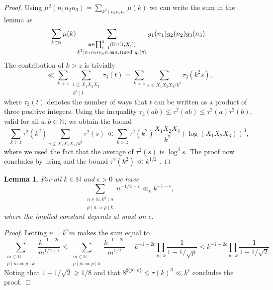 \documentclass[a4paper,12pt,reqno]{amsart}
\numberwithin{equation}{section} \numberwithin{figure}{section}
\newcommand\N{\mathbb{N}}
\newcommand{\md}[1]{  \left(\textnormal{mod}\ #1\right)}
\renewcommand{\b}{\mathbf}
\renewcommand{\leq}{\leqslant}
\renewcommand{\geq}{\geqslant}
\renewcommand{\#}{\sharp}
\newtheorem{lemma}{Lemma}
\theoremstyle{definition}
\numberwithin{lemma}{section}
\begin{document}
\begin{proof}Using $\mu^2(n_1n_2n_3) =\sum_{k^2\mid n_1n_2n_3 } \mu(k)$ we can write the sum in the lemma as 
\[\sum_{\substack{ k\in \N } } \mu(k)
\sum_{\substack{ \b n \in \prod_{i=1}^3 (\N \cap [1,X_i] )\\
k^2\mid n_1n_2n_3   , n_i\equiv a_i \md {q_i} \forall i  } }
 g_1(n_1)g_2(n_2)g_3(n_3).\]The contribution of $k>z$ is trivially \[\ll \sum_{k>z} \sum_{\substack{t\leq X_1X_2X_3\\  k^2 \mid t }} \tau_3(t)=
\sum_{k>z} \sum_{s\leq X_1X_2X_3/k^{2}   } \tau_3(k^2s )
,\] where $\tau_3(t)$ denotes the number of ways 
that $t$ can be written as a product of three positive integers. Using the inequality 
$\tau_3(ab)\leq 
\tau^2(ab ) \leq 
\tau^2(a)\tau^2 (b)$, valid for all $a,b\in \N$,
we obtain the bound  \[\sum_{k>z} \tau^2(k^2 )\sum_{s\leq X_1X_2X_3/k^{2}   } \tau^2( s )\ll 
\sum_{k>z} \tau^2(k^2 ) \frac{ X_1X_2X_3}{k^2} (\log (X_1X_2X_3) )^3
 ,\] where we used the fact that  the average of $\tau^2(s)$ is $\log^3 s$.
The proof now concludes by using 
 and the bound $\tau^2(k^2)\ll k^{1/2}$ .\end{proof}
\begin{lemma}\label{lem:bwv2abcfe764}For all $k\in \N$ and $\epsilon>0$ we have $$
\sum_{\substack{ n\in \N,  k^2 \mid n \\ p\mid n \Rightarrow p\mid k } }  n^{-1/2-\epsilon} \ll_\epsilon  k^{-1-\epsilon} ,$$ where the implied constant depends at most on $\epsilon$.
\end{lemma}\begin{proof} Letting $n=k^2 m $ makes the sum equal to 
$$
\sum_{\substack{ m\in \N  \\ p\mid m  \Rightarrow p\mid k } } \frac{k^{-1-2\epsilon} }{m^{1/2+\epsilon}}
\leq 
\sum_{\substack{ m\in \N  \\ p\mid m  \Rightarrow p\mid k } } \frac{k^{-1-2\epsilon}}{m^{1/2}}
=
k^{-1-2\epsilon}\prod_{p\mid k } \frac{1}{1-1/\sqrt p } 
\leq 
k^{-1-2\epsilon}\prod_{p\mid k } \frac{1}{1-1/\sqrt 2 }
$$ Noting that $ 1-1/ \sqrt 2  \geq 1/8 $ and that $8^{\#\{p\mid k \} }\leq \tau(k)^3\ll k ^\epsilon$
concludes the proof.
 \end{proof}
\end{document}
